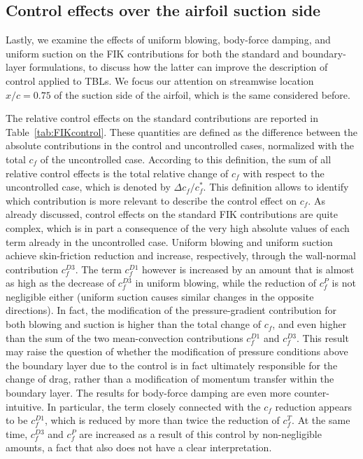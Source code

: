 \subsection{Control effects over the airfoil suction side}
Lastly, we examine the effects of uniform blowing, body-force damping, and uniform suction on the FIK contributions for both the standard and boundary-layer formulations, to discuss how the latter can improve the description of control applied to TBLs. We focus our attention on streamwise location $x/c=0.75$ of the suction side of the airfoil, which is the same considered before.


The relative control effects on the standard contributions are reported in Table~\ref{tab:FIKcontrol}. These quantities are defined as the difference between the absolute contributions in the control and uncontrolled cases, normalized with the total $c_f$ of the uncontrolled case. According to this definition, the sum of all relative control effects is the total relative change of $c_f$ with respect to the uncontrolled case, which is denoted by $\Delta c_f/c_f^*$. This definition allows to identify which contribution is more relevant to describe the control effect on $c_f$. As already discussed\cite{atzo21b}, control effects on the standard FIK contributions are quite complex, which is in part a consequence of the very high absolute values of each term already in the uncontrolled case. Uniform blowing and uniform suction achieve skin-friction reduction and increase, respectively, through the wall-normal contribution $c^{D3}_f$. The term $c^{D1}_f$ however is increased by an amount that is almost as high as the decrease of $c^{D3}_f$ in uniform blowing, while the reduction of $c^P_f$ is not negligible either (uniform suction causes similar changes in the opposite directions). In fact, the modification of the pressure-gradient contribution for both blowing and suction is higher than the total change of $c_f$, and even higher than the sum of the two mean-convection contributions $c^{D1}_f$ and $c^{D3}_f$. This result may raise the question of whether the modification of pressure conditions above the boundary layer due to the control is in fact ultimately responsible for the change of drag, rather than a modification of momentum transfer within the boundary layer. The results for body-force damping are even more counter-intuitive. In particular, the term closely connected with the $c_f$ reduction appears to be $c^{D1}_f$, which is reduced by more than twice the reduction of $c^T_f$. At the same time, $c^{D3}_f$ and $c^{P}_f$ are increased as a result of this control by non-negligible amounts, a fact that also does not have a clear interpretation.


